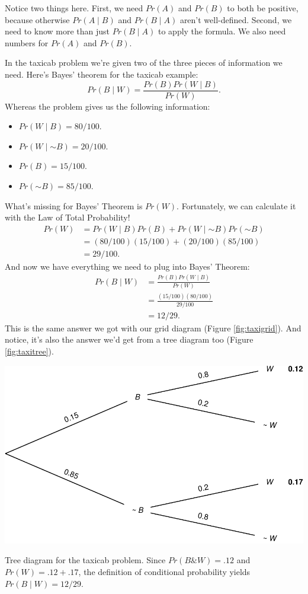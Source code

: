 \documentclass[justified]{tufte-book}
\providecommand{\tightlist}{%
  \setlength{\itemsep}{0pt}\setlength{\parskip}{0pt}}
\newcommand{\given}{\mid}
\renewcommand{\neg}{\mathbin{\sim}}
\renewcommand{\wedge}{\mathbin{\&}}
\newcommand{\p}{Pr}
\theoremstyle{definition}
\theoremstyle{definition}
\theoremstyle{definition}
\theoremstyle{remark}
\begin{document}
Notice two things here. First, we need \(\p(A)\) and \(\p(B)\) to both be positive, because otherwise \(\p(A \given B)\) and \(\p(B \given A)\) aren't well-defined. Second, we need to know more than just \(\p(B \given A)\) to apply the formula. We also need numbers for \(\p(A)\) and \(\p(B)\).

In the taxicab problem we're given two of the three pieces of information we need. Here's Bayes' theorem for the taxicab example:
\[ \p(B \given W) = \frac{\p(B) \p(W \given B)}{\p(W)}. \]
Whereas the problem gives us the following information:

\begin{itemize}
\tightlist
\item
  \(\p(W \given B) = 80/100\).
\item
  \(\p(W \given \neg B) = 20/100\).
\item
  \(\p(B) = 15/100\).
\item
  \(\p(\neg B) = 85/100\).
\end{itemize}

What's missing for Bayes' Theorem is \(\p(W)\). Fortunately, we can calculate it with the Law of Total Probability!
\[
  \begin{aligned}
    \p(W) &= \p(W \given B)\p(B) + \p(W \given \neg B)\p(\neg B)\\
          &= (80/100)(15/100) + (20/100)(85/100)\\
          &= 29/100.
  \end{aligned}
\]
And now we have everything we need to plug into Bayes' Theorem:
\[
  \begin{aligned}
    \p(B \given W) &= \frac{\p(B) \p(W \given B)}{\p(W)}\\
                   &= \frac{(15/100)(80/100)}{29/100}\\
                   &= 12/29.
  \end{aligned}
\]
This is the same answer we got with our grid diagram (Figure \ref{fig:taxigrid}). And notice, it's also the answer we'd get from a tree diagram too (Figure \ref{fig:taxitree}).

\begin{marginfigure}
\includegraphics{_main_files/figure-latex/taxitree-1} \caption[Tree diagram for the taxicab problem]{Tree diagram for the taxicab problem. Since $\p(B \wedge W) = .12$ and $\p(W) = .12 + .17$, the definition of conditional probability yields $\p(B \given W) = 12/29$.}\label{fig:taxitree}
\end{marginfigure}
\end{document}
